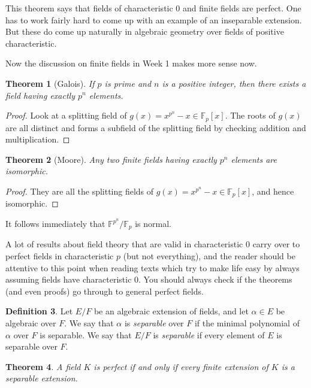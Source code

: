 \documentclass[12pt]{report}
\newtheorem{theorem}{Theorem}[section]
\theoremstyle{definition}
\newtheorem{definition}[theorem]{Definition}
\newcommand{\FF}{\mathbb{F}}
\begin{document}
This theorem says that fields of characteristic 0 and finite fields are perfect. One has to work fairly hard to come up with an example of an inseparable extension. But these do come up naturally in algebraic geometry over fields of positive characteristic.

Now the discussion on finite fields in Week 1 makes more sense now.

\begin{theorem}[Galois]
	If $p$ is prime and $n$ is a positive integer, then there exists a field having exactly $p^n$ elements.
\end{theorem}

\begin{proof}
	Look at a splitting field of $g(x)=x^{p^n}-x\in \FF_p[x]$. The roots of $g(x)$ are all distinct and forms a subfield of the splitting field by checking addition and multiplication.
\end{proof}

\begin{theorem}[Moore]
	Any two finite fields having exactly $p^n$ elements are isomorphic.
\end{theorem}

\begin{proof}
	They are all the splitting fields of $g(x)=x^{p^n}-x\in \FF_p[x]$, and hence isomorphic.
\end{proof}

\begin{remark}
	It follows immediately that $\FF^{p^n}/\FF_p$ is normal.
\end{remark}

A lot of results about field theory that are valid in characteristic 0 carry over to perfect fields in characteristic $p$ (but not everything), and the reader should be attentive to this point when reading texts which try to make life easy by always assuming fields have characteristic 0. You should always check if the theorems (and even proofs) go through to general perfect fields.

\begin{definition}
	Let $E/F$ be an algebraic extension of fields, and let $\alpha \in E$ be algebraic over $F$. We say that $\alpha$ is \emph{separable} over $F$ if the minimal polynomial of $\alpha$ over $F$ is separable. We say that $E/F$ is \emph{separable} if every element of $E$ is separable over $F$.
\end{definition}


\begin{theorem}
	A field $K$ is perfect if and only if every finite extension of $K$ is a separable extension.
\end{theorem}
\end{document}

